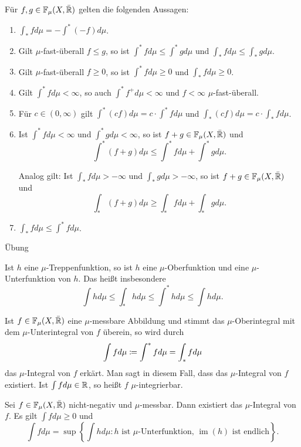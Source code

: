 \documentclass[a4paper,twoside,DIV15,BCOR12mm]{scrbook}
\DeclareMathOperator{\im}{im}
\begin{document}
\begin{lemma}
\label{lem1.11}
Für $f,g\in\mathbb F_\mu(X,\bar{\mathbb{R}})$ gelten die folgenden Aussagen:
\begin{enumerate}
\item $\int_* fd\mu = - \int^* (-f)d\mu$.
\item Gilt $\mu$-fast-überall $f\le g$, so ist $\int^* fd\mu \le \int^* gd\mu$ und $\int_* fd\mu \le \int_* gd\mu$.
\item Gilt $\mu$-fast-überall $f\ge 0$, so ist $\int^* fd\mu \ge 0$ und $\int_* fd\mu \ge 0$.
\item Gilt $\int^* fd\mu <\infty$, so auch $\int^*f^+d\mu<\infty$ und $f<\infty$ $\mu$-fast-überall.
\item Für $c\in(0,\infty)$ gilt $\int^*(cf)d\mu = c\cdot \int^*fd\mu$ und $\int_*(cf)d\mu = c\cdot \int_*fd\mu$.
\item Ist $\int^* fd\mu <\infty$ und $\int^*g d\mu<\infty$, so ist $f+g \in \mathbb F_\mu(X,\bar{\mathbb{R}})$ und $$\int^*(f+g)d\mu \le \int^*fd\mu + \int^*gd\mu.$$

Analog gilt: Ist $\int_* fd\mu >-\infty$ und $\int_*g d\mu>-\infty$, so ist $f+g \in \mathbb F_\mu(X,\bar{\mathbb{R}})$ und $$\int_*(f+g)d\mu \ge \int_*fd\mu + \int_*gd\mu.$$
\item $\int_* fd\mu \le \int^* fd\mu$.
\end{enumerate}
\end{lemma}

\begin{beweis} Übung
\end{beweis}

\begin{bemerkung}
Ist $h$ eine $\mu$-Treppenfunktion, so ist $h$ eine $\mu$-Oberfunktion und eine $\mu$-Unterfunktion von $h$. Das heißt insbesondere
\[
\int hd\mu \le \int_* h d\mu \le \int^* h d\mu \le \int h d\mu.
\]
\end{bemerkung}

\begin{definition}
Ist $f\in \mathbb F_\mu(X,\bar{\mathbb{R}})$ eine $\mu$-messbare Abbildung und stimmt das $\mu$-Oberintegral mit dem $\mu$-Unterintegral von $f$ überein, so wird durch
\[
\int fd\mu \da \int^* fd\mu = \int_* fd\mu
\]
das $\mu$-Integral von $f$ erkärt. Man sagt in diesem Fall, dass das $\mu$-Integral von $f$ existiert. Ist $\int fd\mu \in \mathbb{R}$, so heißt $f$ $\mu$-integrierbar.
\end{definition}

\begin{satz}
\label{satz1.12}
Sei $f\in \mathbb F_\mu(X,\bar{\mathbb{R}})$ nicht-negativ und $\mu$-messbar. Dann existiert das $\mu$-Integral von $f$. Es gilt $\int fd\mu \ge 0$ und 
\[
\int fd\mu = \sup\left\{ \int hd\mu : \text{$h$ ist $\mu$-Unterfunktion, $\im(h)$ ist endlich}\right\}.
\]
\end{satz}
\end{document}
